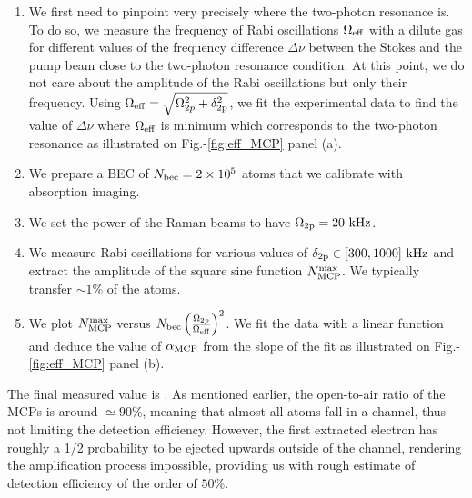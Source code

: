 \begin{enumerate}
    \item We first need to pinpoint very precisely where the two-photon resonance is. To do so, we measure the frequency of Rabi oscillations $\Omega_{\rm{eff}}$ with a dilute gas for different values of the frequency difference $\Delta \nu$ between the Stokes and the pump beam close to the two-photon resonance condition. At this point, we do not care about the amplitude of the Rabi oscillations but only their frequency. Using $\Omega_{\rm{eff}}= \sqrt{\Omega_{2p}^2 + \delta_{\rm{2p}}^2}$, we fit the experimental data to find the value of $\Delta \nu$ where $\Omega_{\rm{eff}}$ is minimum which corresponds to the two-photon resonance as illustrated on Fig.-\ref{fig:eff_MCP} panel (a).
    \item We prepare a BEC of $N_{\rm{bec}} = 2 \times 10^5$ atoms that we calibrate with absorption imaging.
    \item We set the power of the Raman beams to have $\Omega_{\rm{2p}}=20 \ \rm{kHz}$.
    \item We measure Rabi oscillations for various values of $\delta_{\rm{2p}} \in [300,1000] \ \rm{kHz}$ and extract the amplitude of the square sine function $N^{\rm{max}}_{\rm{MCP}}$. We typically transfer $\sim 1\%$ of the atoms. 
    \item We plot $N^{\rm{max}}_{\rm{MCP}}$ versus $N_{\rm{bec}} \left(\frac{\Omega_{2 p}}{\Omega_{\rm{eff}}}\right)^{2}$. We fit the data with a linear function and deduce the value of $\alpha_{\rm{MCP}}$ from the slope of the fit as illustrated on Fig.-\ref{fig:eff_MCP} panel (b).
\end{enumerate}

\noindent The final measured value is . As mentioned earlier, the open-to-air ratio of the MCPs is around $\simeq 90 \%$, meaning that almost all atoms fall in a channel, thus not limiting the detection efficiency. However, the first extracted electron has roughly a 1/2 probability to be ejected upwards outside of the channel, rendering the amplification process impossible, providing us with rough estimate of detection efficiency of the order of $50 \%$.


